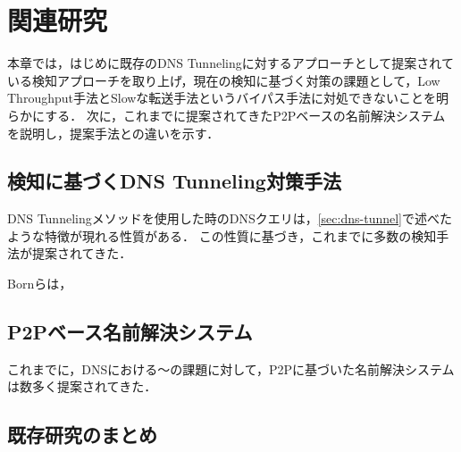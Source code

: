 \section{関連研究}
\label{sec:related-works}
本章では，はじめに既存のDNS Tunnelingに対するアプローチとして提案されている検知アプローチを取り上げ，現在の検知に基づく対策の課題として，Low Throughput手法とSlowな転送手法というバイパス手法に対処できないことを明らかにする．
次に，これまでに提案されてきたP2Pベースの名前解決システムを説明し，提案手法との違いを示す．

\subsection{検知に基づくDNS Tunneling対策手法}
DNS Tunnelingメソッドを使用した時のDNSクエリは，\ref{sec:dns-tunnel}で述べたような特徴が現れる性質がある．
この性質に基づき，これまでに多数の検知手法が提案されてきた．

Bornら\cite{born}は，

\subsection{P2Pベース名前解決システム}
これまでに，DNSにおける〜の課題に対して，P2Pに基づいた名前解決システムは数多く提案されてきた．

\subsection{既存研究のまとめ}

